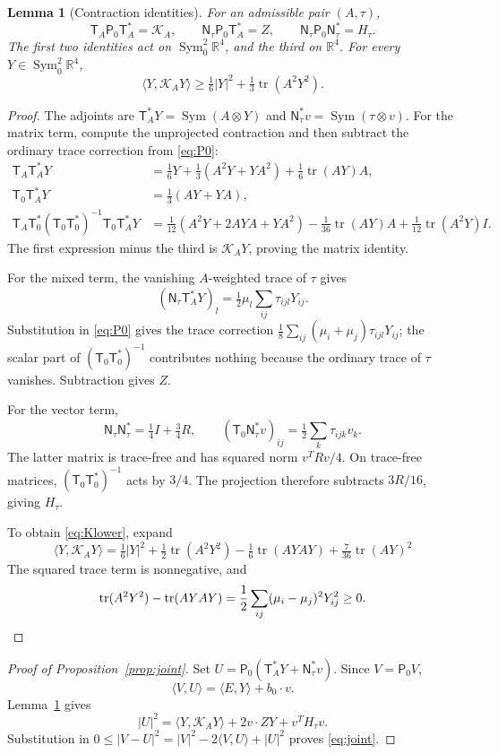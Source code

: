\documentclass[11pt,a4paper]{amsart}
\numberwithin{equation}{section}
\newtheorem{lemma}[theorem]{Lemma}
\theoremstyle{definition}
\theoremstyle{remark}
\DeclareMathOperator{\tr}{tr}
\DeclareMathOperator{\Sym}{Sym}
\newcommand{\R}{\mathbb R}
\newcommand{\K}{\mathcal K}
\newcommand{\T}{\mathsf T}
\newcommand{\N}{\mathsf N}
\newcommand{\Pz}{\mathsf P_0}
\newcommand{\Szero}{\operatorname{Sym}^2_0\R^4}
\begin{document}
\begin{lemma}[Contraction identities]\label{lem:Gram}
For an admissible pair $(A,\tau)$,
\begin{equation}\label{eq:Grams}
 \T_A\Pz\T_A^*=\K_A,\qquad
 \N_\tau\Pz\T_A^*=Z,\qquad
 \N_\tau\Pz\N_\tau^*=H_\tau.
\end{equation}
The first two identities act on $\Szero$, and the third on $\R^4$.
For every $Y\in\Szero$,
\begin{equation}\label{eq:Klower}
 \langle Y,\K_AY\rangle
 \ge\tfrac16|Y|^2+\tfrac13\tr(A^2Y^2).
\end{equation}
\end{lemma}
\begin{proof}
The adjoints are $\T_A^*Y=\Sym(A\otimes Y)$ and
$\N_\tau^*v=\Sym(\tau\otimes v)$.
For the matrix term, compute the unprojected contraction and then
subtract the ordinary trace correction from \eqref{eq:P0}:
\begin{align*}
 \T_A\T_A^*Y
 &=\tfrac16Y+\tfrac13(A^2Y+YA^2)+\tfrac16\tr(AY)A,\\
 \T_0\T_A^*Y&=\tfrac13(AY+YA),\\
 \T_A\T_0^*(\T_0\T_0^*)^{-1}\T_0\T_A^*Y
 &=\tfrac1{12}(A^2Y+2AYA+YA^2)-\tfrac1{36}\tr(AY)A
       +\tfrac1{12}\tr(A^2Y)I.
\end{align*}
The first expression minus the third is $\K_AY$, proving the
matrix identity.

For the mixed term, the vanishing $A$-weighted trace of $\tau$ gives
\[
 (\N_\tau\T_A^*Y)_l=\tfrac12\mu_l\sum_{ij}\tau_{ijl}Y_{ij}.
\]
Substitution in \eqref{eq:P0} gives the trace correction
$\frac18\sum_{ij}(\mu_i+\mu_j)\tau_{ijl}Y_{ij}$; the scalar part
of $(\T_0\T_0^*)^{-1}$ contributes nothing because the ordinary trace
of $\tau$ vanishes. Subtraction gives $Z$.

For the vector term,
\[
 \N_\tau\N_\tau^*=\tfrac14I+\tfrac34R,\qquad
 (\T_0\N_\tau^*v)_{ij}=\tfrac12\sum_k\tau_{ijk}v_k.
\]
The latter matrix is trace-free and has squared norm $v^TRv/4$.
On trace-free matrices, $(\T_0\T_0^*)^{-1}$ acts by $3/4$.
The projection therefore subtracts $3R/16$, giving $H_\tau$.

To obtain \eqref{eq:Klower}, expand
\[
 \langle Y,\K_AY\rangle
 =\tfrac16|Y|^2+\tfrac12\tr(A^2Y^2)
   -\tfrac16\tr(AYAY)+\tfrac7{36}\tr(AY)^2
\]
The squared trace term is nonnegative, and
\[
 \tr(A^2Y^2)-\tr(AYAY)
 =\frac12\sum_{ij}(\mu_i-\mu_j)^2Y_{ij}^2\ge0.\qedhere
\]
\end{proof}

\begin{proof}[Proof of Proposition~\ref{prop:joint}]
Set $U=\Pz(\T_A^*Y+\N_\tau^*v)$. Since $V=\Pz V$,
\[
 \langle V,U\rangle=\langle E,Y\rangle+b_0\cdot v.
\]
Lemma~\ref{lem:Gram} gives
\[
 |U|^2=\langle Y,\K_AY\rangle+2v\cdot ZY+v^TH_\tau v.
\]
Substitution in $0\le|V-U|^2=|V|^2-2\langle V,U\rangle+|U|^2$
proves \eqref{eq:joint}.
\end{proof}
\end{document}
